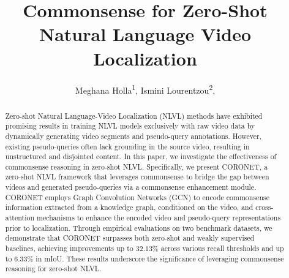 \documentclass[letterpaper]{article} %
\title{Commonsense for Zero-Shot Natural Language Video Localization}
\author {
    Meghana Holla\textsuperscript{\rm 1},
    Ismini Lourentzou\textsuperscript{\rm 2},
}
\newcommand*{\elbafont}{\fontfamily{augie}\selectfont}
\newcommand*\modelname{{\scriptsize \elbafont CORONET}\xspace}
\begin{document}
\maketitle

\begin{abstract}
Zero-shot Natural Language-Video Localization (NLVL) methods have exhibited promising results in training NLVL models exclusively with raw video data by dynamically generating video segments and pseudo-query annotations.
However, existing pseudo-queries often lack grounding in the source video, resulting in unstructured and disjointed content. In this paper, we investigate the effectiveness of commonsense reasoning in zero-shot NLVL. Specifically, we present \modelname, a zero-shot NLVL framework that leverages commonsense to bridge the gap between videos and generated pseudo-queries via a commonsense enhancement module. \modelname employs Graph Convolution Networks (GCN) to encode commonsense information extracted from a knowledge graph, conditioned on the video, and cross-attention mechanisms to enhance the encoded video and pseudo-query representations prior to localization. Through empirical evaluations on two benchmark datasets, we demonstrate that \modelname surpasses both zero-shot and weakly supervised baselines, achieving improvements up to $32.13\%$ across various recall thresholds and up to $6.33\%$ in mIoU. These results underscore the significance of leveraging commonsense reasoning for zero-shot NLVL.
\end{abstract}







{\small }
\newpage
\appendix

\end{document}

